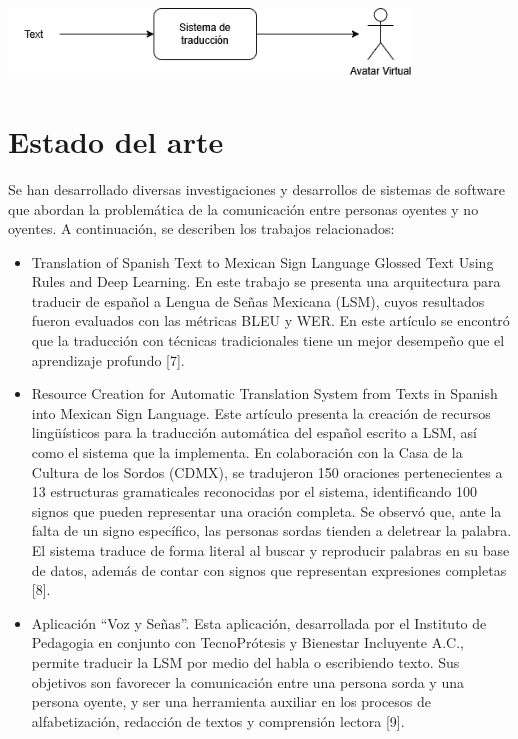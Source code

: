 \begin{center}
    \includegraphics[width=0.8\textwidth]{Images/Cap 1/diacajanegra.png}
\end{center}

\newpage
\section{Estado del arte}
Se han desarrollado diversas investigaciones y desarrollos de sistemas de software que abordan la problemática de la comunicación entre personas oyentes y no oyentes. A continuación, se describen los trabajos relacionados: \begin{itemize}
    \item Translation of Spanish Text to Mexican Sign Language Glossed Text Using Rules and Deep Learning. En este trabajo se presenta una arquitectura para traducir de español a Lengua de Señas Mexicana (LSM), cuyos resultados fueron evaluados con las métricas BLEU y WER. En este artículo se encontró que la traducción con técnicas tradicionales tiene un mejor desempeño que el aprendizaje profundo [7].
\item Resource Creation for Automatic Translation System from Texts in Spanish into Mexican Sign Language. Este artículo presenta la creación de recursos lingüísticos para la traducción automática del español escrito a LSM, así como el sistema que la implementa. En colaboración con la Casa de la Cultura de los Sordos (CDMX), se tradujeron 150 oraciones pertenecientes a 13 estructuras gramaticales reconocidas por el sistema, identificando 100 signos que pueden representar una oración completa. Se observó que, ante la falta de un signo específico, las personas sordas tienden a deletrear la palabra. El sistema traduce de forma literal al buscar y reproducir palabras en su base de datos, además de contar con signos que representan expresiones completas [8].
\item Aplicación “Voz y Señas”. Esta aplicación, desarrollada por el Instituto de Pedagogia en conjunto con TecnoPrótesis y Bienestar Incluyente A.C., permite traducir la LSM por medio del habla o escribiendo texto. Sus objetivos son favorecer la comunicación entre una persona sorda y una persona oyente, y ser una herramienta auxiliar en los procesos de alfabetización, redacción de textos y comprensión lectora [9]. 

\end{itemize}
